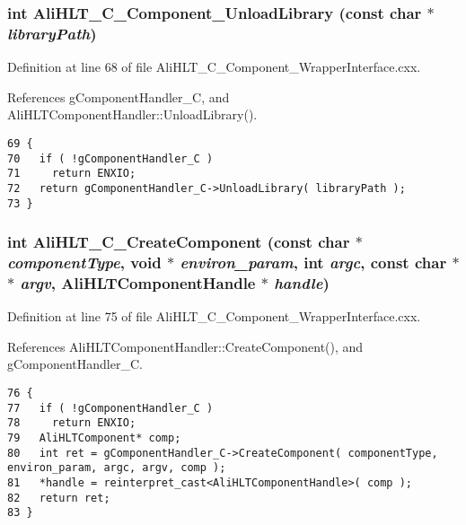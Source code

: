 \subsubsection{\setlength{\rightskip}{0pt plus 5cm}int Ali\-HLT\_\-C\_\-Component\_\-Unload\-Library (const char $\ast$ {\em library\-Path})}\label{group__alihlt__wrapper__interface_ga5}




Definition at line 68 of file Ali\-HLT\_\-C\_\-Component\_\-Wrapper\-Interface.cxx.

References g\-Component\-Handler\_\-C, and Ali\-HLTComponent\-Handler::Unload\-Library().

\footnotesize\begin{verbatim}69 {
70   if ( !gComponentHandler_C )
71     return ENXIO;
72   return gComponentHandler_C->UnloadLibrary( libraryPath );
73 }
\end{verbatim}\normalsize 


\subsubsection{\setlength{\rightskip}{0pt plus 5cm}int Ali\-HLT\_\-C\_\-Create\-Component (const char $\ast$ {\em component\-Type}, void $\ast$ {\em environ\_\-param}, int {\em argc}, const char $\ast$$\ast$ {\em argv}, {\bf Ali\-HLTComponent\-Handle} $\ast$ {\em handle})}\label{group__alihlt__wrapper__interface_ga6}




Definition at line 75 of file Ali\-HLT\_\-C\_\-Component\_\-Wrapper\-Interface.cxx.

References Ali\-HLTComponent\-Handler::Create\-Component(), and g\-Component\-Handler\_\-C.

\footnotesize\begin{verbatim}76 {
77   if ( !gComponentHandler_C )
78     return ENXIO;
79   AliHLTComponent* comp;
80   int ret = gComponentHandler_C->CreateComponent( componentType, environ_param, argc, argv, comp );
81   *handle = reinterpret_cast<AliHLTComponentHandle>( comp );
82   return ret;
83 }
\end{verbatim}\normalsize 


